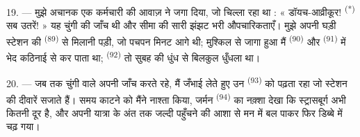 \VUsaut{3.0mm}
\VUsaut{3.0mm}

19. --- मुझे अचानक एक कर्मचारी की आवाज़ ने जगा दिया, जो चिल्ला रहा था :
« डॉयच-आव्रीकूर! \textsuperscript{(*)} सब उतरें! » यह चुंगी की जाँच थी और सीमा की
सारी झंझट भरी औपचारिकताएँ। मुझे अपनी घड़ी स्टेशन की 
\textsuperscript{(89)} से मिलानी पड़ी, जो पचपन मिनट आगे थी; मुश्किल से जागा हुआ मैं
 \textsuperscript{(90)} और  \textsuperscript{(91)} में
भेद कठिनाई से कर पाता था;  \textsuperscript{(92)} तो सुबह की धुंध से
बिलकुल धुँधला था।

20. --- जब तक चुंगी वाले अपनी जाँच करते रहे, मैं जँभाई लेते हुए उन
 \textsuperscript{(93)} को पढ़ता रहा जो स्टेशन की दीवारें सजाते
हैं। समय काटने को मैंने नाश्ता किया, जर्मन  \textsuperscript{(94)} का
नक़्शा देखा कि स्ट्रासबूर्ग अभी कितनी दूर है, और अपनी यात्रा के अंत तक जल्दी
पहुँचने की आशा से मन में बल पाकर फिर डिब्बे में चढ़ गया।
\VUsaut{6.0mm}
\VUfilet{22mm}
